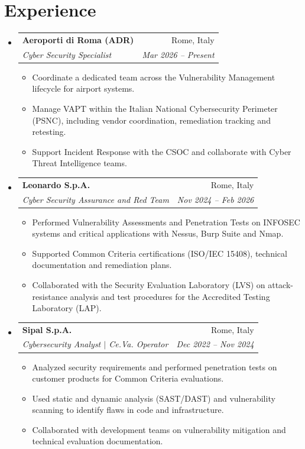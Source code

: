 \documentclass[letterpaper,11pt]{article}
\makeatletter
\newcommand{\resumeItem}[1]{\item\small{{#1\vspace{-2pt}}}}
\newcommand{\resumeSubheading}[4]{
  \vspace{-1pt}\item
  \begin{tabular*}{0.97\textwidth}[t]{l@{\extracolsep{\fill}}r}
    \textbf{#1} & #2 \\
    \textit{\small#3} & \textit{\small#4} \\
  \end{tabular*}\vspace{-3pt}
}
\newcommand{\resumeSubHeadingListStart}{\begin{itemize}[leftmargin=0.15in,label={},topsep=3pt,itemsep=4pt,parsep=0pt]}
\newcommand{\resumeSubHeadingListEnd}{\end{itemize}}
\newcommand{\resumeItemListStart}{\begin{itemize}[topsep=3pt,itemsep=2pt,parsep=0pt]}
\newcommand{\resumeItemListEnd}{\end{itemize}\vspace{-5pt}}
\makeatother
\begin{document}
\section{Experience}
\resumeSubHeadingListStart
  \resumeSubheading{Aeroporti di Roma (ADR)}{Rome, Italy}
    {Cyber Security Specialist}{Mar 2026 -- Present}
    \resumeItemListStart
      \resumeItem{Coordinate a dedicated team across the Vulnerability Management lifecycle for airport systems.}
      \resumeItem{Manage VAPT within the Italian National Cybersecurity Perimeter (PSNC), including vendor coordination, remediation tracking and retesting.}
      \resumeItem{Support Incident Response with the CSOC and collaborate with Cyber Threat Intelligence teams.}
    \resumeItemListEnd
  \resumeSubheading{Leonardo S.p.A.}{Rome, Italy}
    {Cyber Security Assurance and Red Team}{Nov 2024 -- Feb 2026}
    \resumeItemListStart
      \resumeItem{Performed Vulnerability Assessments and Penetration Tests on INFOSEC systems and critical applications with Nessus, Burp Suite and Nmap.}
      \resumeItem{Supported Common Criteria certifications (ISO/IEC 15408), technical documentation and remediation plans.}
      \resumeItem{Collaborated with the Security Evaluation Laboratory (LVS) on attack-resistance analysis and test procedures for the Accredited Testing Laboratory (LAP).}
    \resumeItemListEnd
  \resumeSubheading{Sipal S.p.A.}{Rome, Italy}
    {Cybersecurity Analyst $|$ Ce.Va. Operator}{Dec 2022 -- Nov 2024}
    \resumeItemListStart
      \resumeItem{Analyzed security requirements and performed penetration tests on customer products for Common Criteria evaluations.}
      \resumeItem{Used static and dynamic analysis (SAST/DAST) and vulnerability scanning to identify flaws in code and infrastructure.}
      \resumeItem{Collaborated with development teams on vulnerability mitigation and technical evaluation documentation.}
    \resumeItemListEnd
\resumeSubHeadingListEnd
\end{document}
